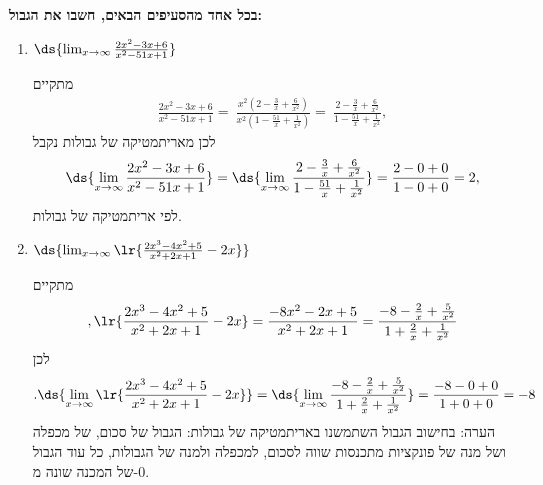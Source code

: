 \textbf{
בכל אחד מהסעיפים הבאים,
חשבו את הגבול: }
\begin{enumerate}
\item $\ds{\lim_{x\to\infty}\frac{2x^2-3x+6}{x^2-51x+1}}$
\ifsol
\begin{solbox}
מתקיים
\begin{align*}
    \frac{2x^2-3x+6}{x^2-51x+1}=\ \frac{x^2(2-\tfrac{3}{x}+\tfrac{6}{x^2})}{x^2(1-\tfrac{51}{x}+\tfrac{1}{x^2})}
    =\ \frac{2-\tfrac{3}{x}+\tfrac{6}{x^2}}{1-\tfrac{51}{x}+\tfrac{1}{x^2}},
\end{align*}
לכן
מאריתמטיקה של גבולות נקבל
\begin{align*}
    \ds{\lim_{x\to\infty}\frac{2x^2-3x+6}{x^2-51x+1}}
    =\ds{\lim_{x\to\infty}\frac{2-\tfrac{3}{x}+\tfrac{6}{x^2}}{1-\tfrac{51}{x}+\tfrac{1}{x^2}}}
    = \frac{2-0+0}{1-0+0}
    = 2,
\end{align*}
לפי אריתמטיקה של גבולות.
\end{solbox}
\fi

\item $\ds{ \lim_{x \to \infty} \lr{\frac{2x^3 - 4x^2 + 5}{x^2 + 2x +1}-2x}}$
\ifsol
{}
\begin{solbox}
מתקיים
\begin{align*}
    ,\lr{\frac{2x^3 - 4x^2 + 5}{x^2 + 2x +1}-2x}= \frac{ - 8x^2 -2x+ 5}{x^2 + 2x +1}
    = \frac{-8-\tfrac{2}{x}+\tfrac{5}{x^2}}{1+\frac{2}{x}+\frac{1}{x^2}}
\end{align*}
לכן
\begin{align*}
    .\ds{ \lim_{x \to \infty} \lr{\frac{2x^3 - 4x^2 + 5}{x^2 + 2x +1}-2x}}
    = \ds{ \lim_{x \to \infty}\frac{-8-\tfrac{2}{x}+\tfrac{5}{x^2}}{1+\frac{2}{x}+\frac{1}{x^2}}}
    = \frac{-8-0+0}{1+0+0}
    = -8
\end{align*}
הערה: בחישוב הגבול השתמשנו באריתמטיקה של גבולות: הגבול של סכום, של מכפלה ושל מנה של פונקציות מתכנסות שווה לסכום, למכפלה ולמנה של הגבולות, כל עוד הגבול של המכנה שונה מ-$0$.
\end{solbox}
\fi


\end{enumerate}
